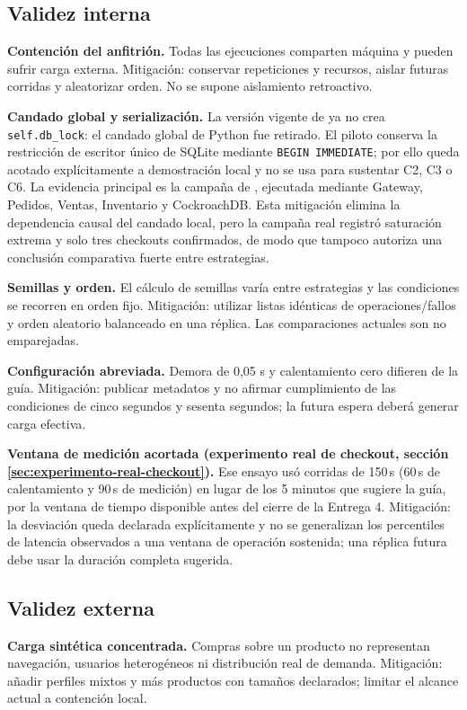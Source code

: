\documentclass[12pt,a4paper]{article}
\begin{document}
\subsection{Validez interna}
\textbf{Contención del anfitrión.} Todas las ejecuciones comparten máquina y pueden sufrir carga externa. Mitigación: conservar repeticiones y recursos, aislar futuras corridas y aleatorizar orden. No se supone aislamiento retroactivo.

\textbf{Candado global y serialización.} La versión vigente de  ya no crea \texttt{self.db\_lock}: el candado global de Python fue retirado. El piloto conserva la restricción de escritor único de SQLite mediante \texttt{BEGIN IMMEDIATE}; por ello queda acotado explícitamente a demostración local y no se usa para sustentar C2, C3 o C6. La evidencia principal es la campaña de , ejecutada mediante Gateway, Pedidos, Ventas, Inventario y CockroachDB. Esta mitigación elimina la dependencia causal del candado local, pero la campaña real registró saturación extrema y solo tres checkouts confirmados, de modo que tampoco autoriza una conclusión comparativa fuerte entre estrategias.

\textbf{Semillas y orden.} El cálculo de semillas varía entre estrategias y las condiciones se recorren en orden fijo. Mitigación: utilizar listas idénticas de operaciones/fallos y orden aleatorio balanceado en una réplica. Las comparaciones actuales son no emparejadas.

\textbf{Configuración abreviada.} Demora de 0,05 s y calentamiento cero difieren de la guía. Mitigación: publicar metadatos y no afirmar cumplimiento de las condiciones de cinco segundos y sesenta segundos; la futura espera deberá generar carga efectiva.

\textbf{Ventana de medición acortada (experimento real de checkout, sección \ref{sec:experimento-real-checkout}).} Ese ensayo usó corridas de 150\,s (60\,s de calentamiento y 90\,s de medición) en lugar de los 5 minutos que sugiere la guía, por la ventana de tiempo disponible antes del cierre de la Entrega 4. Mitigación: la desviación queda declarada explícitamente y no se generalizan los percentiles de latencia observados a una ventana de operación sostenida; una réplica futura debe usar la duración completa sugerida.

\subsection{Validez externa}
\textbf{Carga sintética concentrada.} Compras sobre un producto no representan navegación, usuarios heterogéneos ni distribución real de demanda. Mitigación: añadir perfiles mixtos y más productos con tamaños declarados; limitar el alcance actual a contención local.
\end{document}
